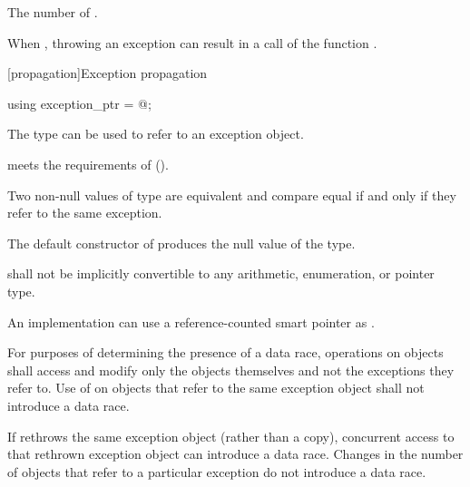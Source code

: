 \begin{itemdescr}
\pnum
\returns
The number of .

\pnum
\remarks
When ,
throwing an exception can result in a call of the function
.
\end{itemdescr}

[propagation]{Exception propagation}

%
\begin{itemdecl}
using exception_ptr = @\unspec@;
\end{itemdecl}

\begin{itemdescr}
\pnum
The type  can be used to refer to an exception object.

\pnum
{} meets the requirements of
 ().

\pnum
Two non-null values of type  are equivalent and compare equal if and
only if they refer to the same exception.

\pnum
The default constructor of  produces the null value of the
type.

\pnum
{} shall not be implicitly convertible to any arithmetic,
enumeration, or pointer type.

\pnum
\begin{note}
An implementation can use a reference-counted smart
pointer as .
\end{note}

\pnum
For purposes of determining the presence of a data race, operations on
 objects shall access and modify only the
 objects themselves and not the exceptions they refer to.
Use of  on  objects that refer to
the same exception object shall not introduce a data race.
\begin{note}
If
 rethrows the same exception object (rather than a copy),
concurrent access to that rethrown exception object can introduce a data race.
Changes in the number of  objects that refer to a
particular exception do not introduce a data race.
\end{note}
\end{itemdescr}

